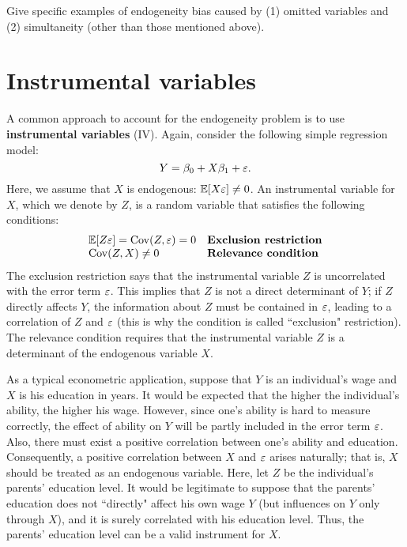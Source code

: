 \documentclass[11pt, A4paper, openany, uplatex]{book}
\begin{document}
\bigskip
\hrulefill
\begin{exercise}\upshape
	Give specific examples of endogeneity bias caused by (1) omitted variables and (2) simultaneity (other than those mentioned above).
\end{exercise}


\section{Instrumental variables}

A common approach to account for the endogeneity problem is to use \textbf{instrumental variables} (IV).
Again, consider the following simple regression model: 
\[
	Y = \beta_0 + X \beta_1 + \varepsilon.
\]
Here, we assume that $X$ is endogenous: $\mathbb{E}[X\varepsilon] \neq 0$.
An instrumental variable for $X$, which we denote by $Z$, is a random variable that satisfies the following conditions:
\[
\begin{array}{ll}
	\E[Z \eps] = \Cov(Z, \eps) = 0 & \textbf{Exclusion restriction\index{exclusion restriction}} \\
	\Cov(Z, X) \neq 0 & \textbf{Relevance condition\index{relevance condition}}
\end{array}
\]
The exclusion restriction says that the instrumental variable $Z$ is uncorrelated with the error term $\varepsilon$.
This implies that $Z$ is not a direct determinant of $Y$; if $Z$ directly affects $Y$, the information about $Z$ must be contained in $\varepsilon$, leading to a correlation of $Z$ and $\varepsilon$ (this is why the condition is called ``exclusion" restriction).
The relevance condition requires that the instrumental variable $Z$ is a determinant of the endogenous variable $X$.

\begin{example}\upshape
	As a typical econometric application, suppose that $Y$ is an individual's wage and $X$ is his education in years.
	It would be expected that the higher the individual's ability, the higher his wage.
	However, since one's ability is hard to measure correctly, the effect of ability on $Y$ will be partly included in the error term $\varepsilon$.
	Also, there must exist a positive correlation between one's ability and education.
	Consequently, a positive correlation between $X$ and $\varepsilon$ arises naturally; that is, $X$ should be treated as an endogenous variable.
	Here, let $Z$ be the individual's parents' education level.
	It would be legitimate to suppose that the parents' education does not ``directly" affect his own wage $Y$ (but influences on $Y$ only through $X$), and it is surely correlated with his education level.
	Thus, the parents' education level can be a valid instrument for $X$.
\end{example}
\end{document}
